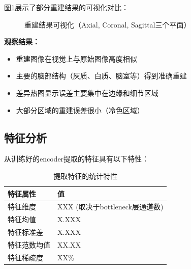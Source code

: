 \documentclass[11pt,a4paper]{article}
\begin{document}
图\ref{fig:reconstruction}展示了部分重建结果的可视化对比：

\begin{figure}[htbp]
    \centering
    \caption{重建结果可视化（Axial, Coronal, Sagittal三个平面）}
    \label{fig:reconstruction}
\end{figure}

\textbf{观察结果：}
\begin{itemize}
    \item 重建图像在视觉上与原始图像高度相似
    \item 主要的脑部结构（灰质、白质、脑室等）得到准确重建
    \item 差异热图显示误差主要集中在边缘和细节区域
    \item 大部分区域的重建误差很小（冷色区域）
\end{itemize}

\subsection{特征分析}

从训练好的encoder提取的特征具有以下特性：

\begin{table}[htbp]
    \centering
    \caption{提取特征的统计特性}
    \label{tab:feature_stats}
    \begin{tabular}{ll}
        \toprule
        \textbf{特征属性} & \textbf{值} \\
        \midrule
        特征维度 & XXX (取决于bottleneck层通道数) \\
        特征均值 & X.XXX \\
        特征标准差 & X.XXX \\
        特征范数均值 & XX.XX \\
        特征稀疏度 & XX\% \\
        \bottomrule
    \end{tabular}
\end{table}
\end{document}
